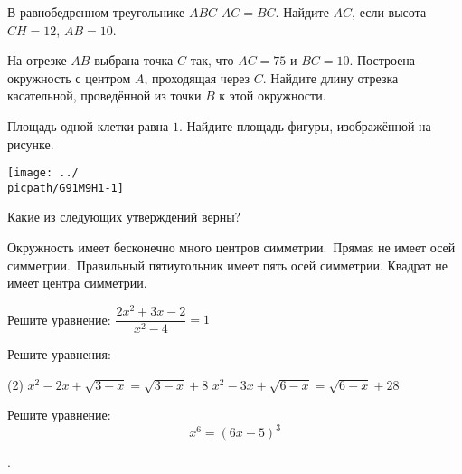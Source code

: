\begin{homework}[number=1]
\begin{listofex}
		\item В равнобедренном треугольнике \( ABC \) \( AC=BC \). Найдите \( AC \), если высота \( CH=12 \), \( AB=10 \).
		\item На отрезке \( AB \) выбрана точка \( C \) так, что \( AC=75 \) и \( BC=10 \). Построена окружность с центром \( A \), проходящая через \( C \). Найдите длину отрезка касательной, проведённой из точки \( B \) к этой окружности.
		\item
		\begin{minipage}[t]{\bodywidth}
			Площадь одной клетки равна \( 1 \). Найдите площадь фигуры, изображённой на рисунке.
			\foranswer
		\end{minipage}
		\gapwidth
		\begin{minipage}[t]{\picwidth}
			\texttt{[image: ../\\picpath/G91M9H1-1]}
		\end{minipage}
		\item Какие из следующих утверждений верны?
		\begin{tasks}
			\task Окружность имеет бесконечно много центров симметрии.
			\task Прямая не имеет осей симметрии.
			\task Правильный пятиугольник имеет пять осей симметрии.
			\task Квадрат не имеет центра симметрии.
		\end{tasks}
	\end{listofex}
\end{homework}

\begin{class}[number=3]
	\begin{listofex}
		\item Решите уравнение: \( \dfrac{2x^2+3x-2}{x^2-4}=1 \)
		\item Решите уравнения:
		\begin{tasks}(2)
			\task \( x^2-2x+\sqrt{3-x}=\sqrt{3-x}+8 \)
			\task \( x^2-3x+\sqrt{6-x}=\sqrt{6-x}+28 \)
		\end{tasks}
		\item Решите уравнение:
		\[x^6=(6x-5)^3\]
		\item 
	\end{listofex}
\end{class}

\begin{class}[number=4]
	\begin{listofex}
		\item .
	\end{listofex}
\end{class}

